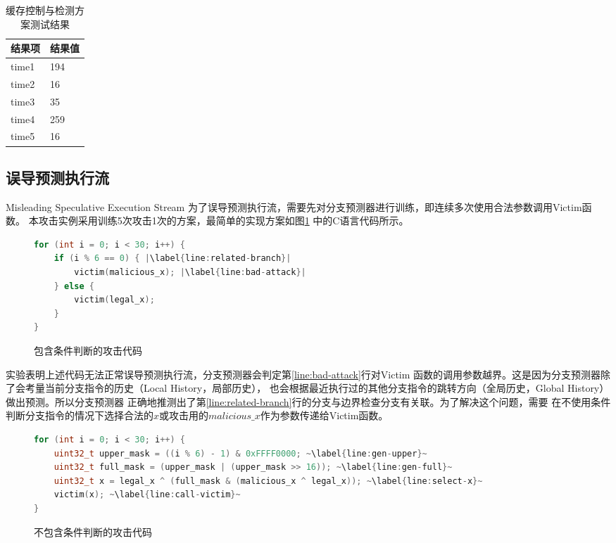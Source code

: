 \begin{table}[!ht]
	\centering
\begin{threeparttable}[b]
\caption{缓存控制与检测方案测试结果}
\begin{tabular}{x{0.2\textwidth}x{0.2\textwidth}}
	\toprule
	结果项 & 结果值 \\
	\midrule
	time1 & 194 \\
	time2 & 16 \\
	time3 & 35 \\
	time4 & 259 \\
	time5 & 16 \\
	\bottomrule
\end{tabular}
\label{tab:cache-test-result}
\end{threeparttable}
\end{table}

\subsection{误导预测执行流}{Misleading Speculative Execution Stream}
为了误导预测执行流，需要先对分支预测器进行训练，即连续多次使用合法参数调用Victim函数。
本攻击实例采用训练5次攻击1次的方案，最简单的实现方案如图\ref{fig:attach-with-branch}
中的C语言代码所示。

\begin{figure}[ht]
	\centering
	\begin{lstlisting}[language=c, escapechar=|]
for (int i = 0; i < 30; i++) {
	if (i % 6 == 0) { |\label{line:related-branch}|
		victim(malicious_x); |\label{line:bad-attack}|
	} else {
		victim(legal_x);
	}
}
	\end{lstlisting}
	\caption{包含条件判断的攻击代码}
	\label{fig:attach-with-branch}
\end{figure}

实验表明上述代码无法正常误导预测执行流，分支预测器会判定第\ref{line:bad-attack}行对Victim
函数的调用参数越界。这是因为分支预测器除了会考量当前分支指令的历史（Local History，局部历史），
也会根据最近执行过的其他分支指令的跳转方向（全局历史，Global History）做出预测。所以分支预测器
正确地推测出了第\ref{line:related-branch}行的分支与边界检查分支有关联。为了解决这个问题，需要
在不使用条件判断分支指令的情况下选择合法的$x$或攻击用的$malicious\_x$作为参数传递给Victim函数。

\begin{figure}[ht]
	\centering
	\begin{lstlisting}[language=c, escapechar=~]
for (int i = 0; i < 30; i++) {
	uint32_t upper_mask = ((i % 6) - 1) & 0xFFFF0000; ~\label{line:gen-upper}~
	uint32_t full_mask = (upper_mask | (upper_mask >> 16)); ~\label{line:gen-full}~
	uint32_t x = legal_x ^ (full_mask & (malicious_x ^ legal_x)); ~\label{line:select-x}~
	victim(x); ~\label{line:call-victim}~
}
	\end{lstlisting}
	\caption{不包含条件判断的攻击代码}
	\label{fig:attach-without-branch}
\end{figure}

